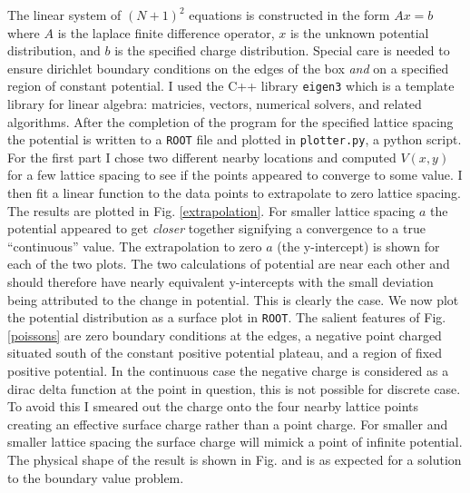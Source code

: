 \documentclass[singlepage,notitlepage,nofootinbib,11pt]{revtex4-1}
\begin{document}
The linear system of $(N+1)^2$ equations is constructed in the form $Ax=b$ where $A$ is the laplace finite difference operator, $x$ is the unknown potential distribution, and $b$ is the specified charge distribution. Special care is needed to ensure dirichlet boundary conditions on the edges of the box {\it and} on a specified region of constant potential. I used the C++ library \texttt{eigen3} which is a template library for linear algebra: matricies, vectors, numerical solvers, and related algorithms. After the completion of the program for the specified lattice spacing the potential is written to a \texttt{ROOT} file and plotted in \texttt{plotter.py}, a python script. For the first part I chose two different nearby locations and computed $V(x,y)$ for a few lattice spacing to see if the points appeared to converge to some value. I then fit a linear function to the data points to extrapolate to zero lattice spacing. The results are plotted in Fig. \ref{extrapolation}. For smaller lattice spacing $a$ the potential appeared to get {\it closer} together signifying a convergence to a true ``continuous'' value. The extrapolation to zero $a$ (the y-intercept) is shown for each of the two plots.  The two calculations of potential are near each other and should therefore have nearly equivalent y-intercepts with the small deviation being attributed to the change in potential. This is clearly the case. We now plot the potential distribution as a surface plot in \texttt{ROOT}. The salient features of Fig. \ref{poissons} are zero boundary conditions at the edges, a negative point charged situated south of the constant positive potential plateau, and a region of fixed positive potential. In the continuous case the negative charge is considered as a dirac delta function at the point in question, this is not possible for discrete case. To avoid this I smeared out the charge onto the four nearby lattice points creating an effective surface charge rather than a point charge. For smaller and smaller lattice spacing the surface charge will mimick a point of infinite potential. The physical shape of the result is shown in Fig.  and is as expected for a solution to the boundary value problem.
\end{document}
